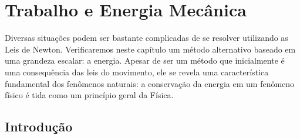 \chapter{Trabalho e Energia Mecânica}
\label{Chap:Energia}





\begin{fullwidth}
{\it

Diversas situações podem ser bastante complicadas de se resolver utilizando as Leis de Newton. Verificaremos neste capítulo um método alternativo baseado em uma grandeza escalar: a energia. Apesar de ser um método que inicialmente é uma consequência das leis do movimento, ele se revela uma característica fundamental dos fenômenos naturais: a conservação da energia em um fenômeno físico é tida como um princípio geral da Física.

}
\end{fullwidth}

\section{Introdução} 

